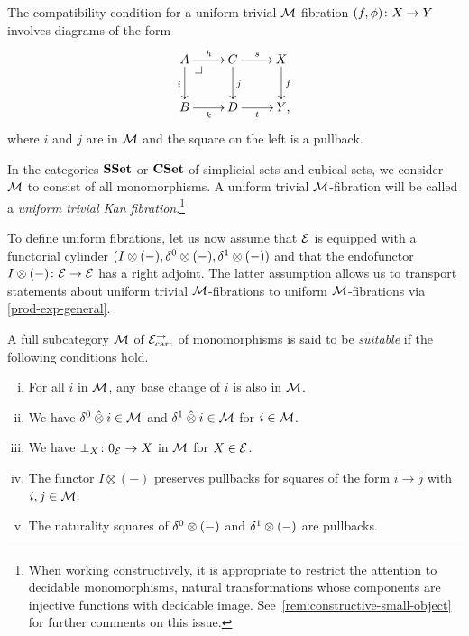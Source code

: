 \documentclass[reqno,10pt,a4paper,oneside,draft]{amsart}
\begin{document}
The compatibility condition for a uniform trivial $\cal{M}$-fibration $(f, \phi) \co X \to Y$ involves diagrams of the form
\[
\xymatrix{
  A
  \ar[r]^{h}
  \ar[d]_{i}
  \pullback{dr}
&
  C \ar[d]^{j}
  \ar[r]^{s}
&
  X \ar[d]^f
\\
  B
  \ar[r]_{k}
&
  D \ar[r]_{t}
&
  Y
\rlap{,}}
\]
where $i$ and $j$ are in $\cal{M}$ and the square on the left is a pullback.

\begin{example} In the categories $\SSet$ or $\CSet$ of simplicial sets and cubical sets, we consider $\cal{M}$ to consist of all monomorphisms. A uniform trivial $\cal{M}$-fibration will be called a \emph{uniform trivial Kan fibration}.\footnote{When working constructively, it is appropriate to restrict the attention to decidable  monomorphisms, \ie natural transformations whose components are injective functions with decidable image. See~\cref{rem:constructive-small-object} for further comments on this issue.}
\end{example}




To define uniform fibrations, let us now assume that $\catE$ is equipped with a functorial cylinder $( \interval \otimes (-), \lcyl \otimes (-), \rcyl \otimes (-))$ and that the endofunctor $ \interval\otimes (-) \co \catE \to \catE$ has a right adjoint.
The latter assumption allows us to transport statements about uniform trivial $\cal{M}$-fibrations to uniform $\cal{M}$-fibrations via \cref{prod-exp-general}.


\begin{definition} \label{uniform-fib-presheaf-cat}
A full subcategory $\cal{M}$ of $\catE_\cart^\to$ of monomorphisms is said
to be \emph{suitable} if the following conditions hold.
\begin{enumerate}[(i)]
\item For all $i$ in $\cal{M}$, any base change of $i$ is also in $\cal{M}$.
\item We have $\lcyl \hatotimes i \in \cal{M}$ and $\rcyl \hatotimes i \in \cal{M}$ for $i \in \cal{M}$.
\item We have $\bot_X \co 0_{\cal{E}} \to X$ in $\cal{M}$ for $X \in \cal{E}$.
\item The functor $I \otimes (-)$ preserves pullbacks for squares of the form $i \to j$ with $i, j \in \cal{M}$.
\item The naturality squares of $\lcyl \otimes (-)$ and $\rcyl \otimes (-)$ are pullbacks.
\end{enumerate}
\end{definition}
\end{document}
